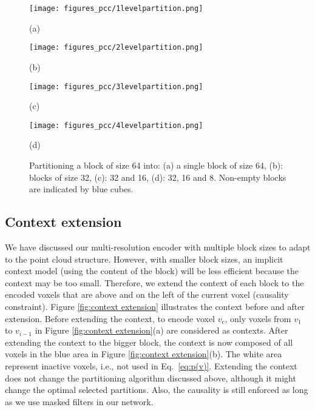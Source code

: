 \begin{figure}
%
\captionsetup{justification=raggedright}
\begin{minipage}[b]{.24\linewidth}
  \centering
  \centerline{\texttt{[image: figures\_pcc/1levelpartition.png]}}
  \centerline{(a)}\medskip
\end{minipage}
\hfill
\begin{minipage}[b]{0.24\linewidth}
  \centering
  \centerline{\texttt{[image: figures\_pcc/2levelpartition.png]}}
  \centerline{(b) }\medskip
\end{minipage}
%
\hfill
\begin{minipage}[b]{0.24\linewidth}
  \centering
  \centerline{\texttt{[image: figures\_pcc/3levelpartition.png]}}
  \centerline{(c) }\medskip
\end{minipage}
%
\hfill
\begin{minipage}[b]{0.24\linewidth}
  \centering
  \centerline{\texttt{[image: figures\_pcc/4levelpartition.png]}}
  \centerline{(d)}\medskip
\end{minipage}
%
\caption{Partitioning a block of size 64 into: (a) a single block of size 64, (b): blocks of size 32, (c): 32 and 16, (d): 32, 16 and 8. Non-empty blocks are indicated by blue cubes.}
\label{fig:4levelpartiitoning}
%
\end{figure}

\subsection{Context extension}\label{ssec:extendcontext}
We have discussed our multi-resolution encoder with multiple block sizes to adapt to the point cloud structure. However, with smaller block sizes, an implicit context model (using the content of the block) will be less efficient because the context may be too small. Therefore, we extend the context of each block to the encoded voxels that are above and on the left of the current voxel (causality constraint). Figure \ref{fig:context extension} illustrates the context before and after extension. Before extending the context, to encode voxel $v_c$, only voxels from $v_1$ to $v_{i-1}$ in Figure \ref{fig:context extension}(a)  are considered as contexts. After extending the context to the bigger block, the context is now composed of all voxels in the blue area in Figure \ref{fig:context extension}(b). The white area represent inactive voxels, i.e., not used in Eq.~\eqref{eq:p(v)}. Extending the context does not change the partitioning algorithm discussed above, although it might change the optimal selected partitions. Also, the causality is still enforced as long as we use masked filters in our network. 

